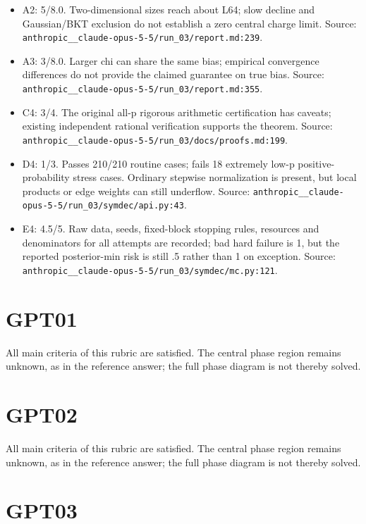 \documentclass[11pt,a4paper]{article}
\begin{document}
\begin{itemize}
\item A2: 5/\allowbreak{}8.0. Two-dimensional sizes reach about L64; slow decline and Gaussian/\allowbreak{}BKT exclusion do not establish a zero central charge limit. Source: \nolinkurl{anthropic__claude-opus-5-5/run_03/report.md:239}.
\item A3: 3/\allowbreak{}8.0. Larger chi can share the same bias; empirical convergence differences do not provide the claimed guarantee on true bias. Source: \nolinkurl{anthropic__claude-opus-5-5/run_03/report.md:355}.
\item C4: 3/\allowbreak{}4. The original all-p rigorous arithmetic certification has caveats; existing independent rational verification supports the theorem. Source: \nolinkurl{anthropic__claude-opus-5-5/run_03/docs/proofs.md:199}.
\item D4: 1/\allowbreak{}3. Passes 210/\allowbreak{}210 routine cases; fails 18 extremely low-p positive-probability stress cases. Ordinary stepwise normalization is present, but local products or edge weights can still underflow. Source: \nolinkurl{anthropic__claude-opus-5-5/run_03/symdec/api.py:43}.
\item E4: 4.5/\allowbreak{}5. Raw data, seeds, fixed-block stopping rules, resources and denominators for all attempts are recorded; bad hard failure is 1, but the reported posterior-min risk is still .5 rather than 1 on exception. Source: \nolinkurl{anthropic__claude-opus-5-5/run_03/symdec/mc.py:121}.
\end{itemize}

\section*{GPT01}

All main criteria of this rubric are satisfied. The central phase region remains unknown, as in the reference answer; the full phase diagram is not thereby solved.


\section*{GPT02}

All main criteria of this rubric are satisfied. The central phase region remains unknown, as in the reference answer; the full phase diagram is not thereby solved.


\section*{GPT03}
\end{document}
